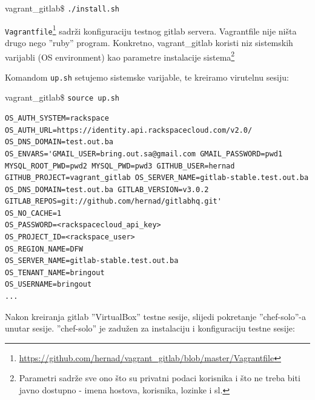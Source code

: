 \documentclass[times, utf8, seminar]{fit}
\begin{document}
vagrant\_gitlab\$ \verb+./install.sh+

\verb+Vagrantfile+\footnote{\url{https://github.com/hernad/vagrant\_gitlab/blob/master/Vagrantfile}} sadrži konfiguraciju testnog gitlab servera. Vagrantfile nije ništa drugo nego ''ruby'' program. Konkretno, vagrant\_gitlab koristi niz sistemskih varijabli (OS environment)  kao parametre instalacije sistema\footnote{Parametri sadrže sve ono što su privatni podaci korisnika i što ne treba biti javno dostupno - imena hostova, korisnika, lozinke i sl.}

Komandom \verb+up.sh+ setujemo sistemske varijable, te kreiramo virutelnu sesiju:

vagrant\_gitlab\$ \verb+source up.sh+

\begin{lstlisting}
OS_AUTH_SYSTEM=rackspace
OS_AUTH_URL=https://identity.api.rackspacecloud.com/v2.0/
OS_DNS_DOMAIN=test.out.ba
OS_ENVARS='GMAIL_USER=bring.out.sa@gmail.com GMAIL_PASSWORD=pwd1 MYSQL_ROOT_PWD=pwd2 MYSQL_PWD=pwd3 GITHUB_USER=hernad GITHUB_PROJECT=vagrant_gitlab OS_SERVER_NAME=gitlab-stable.test.out.ba OS_DNS_DOMAIN=test.out.ba GITLAB_VERSION=v3.0.2 GITLAB_REPOS=git://github.com/hernad/gitlabhq.git'
OS_NO_CACHE=1
OS_PASSWORD=<rackspacecloud_api_key>
OS_PROJECT_ID=<rackspace_user>
OS_REGION_NAME=DFW
OS_SERVER_NAME=gitlab-stable.test.out.ba
OS_TENANT_NAME=bringout
OS_USERNAME=bringout
...
\end{lstlisting}

Nakon kreiranja gitlab ''VirtualBox'' testne sesije, slijedi pokretanje ''chef-solo''-a unutar sesije. ''chef-solo'' je zadužen za instalaciju i konfiguraciju testne sesije:
\end{document}
